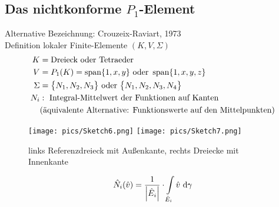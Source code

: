 \subsection{Das nichtkonforme \texorpdfstring{$P_1$}{P\_1}-Element}
Alternative Bezeichnung: Crouzeix-Raviart, 1973\\
Definition lokaler Finite-Elemente $(K,V,\Sigma)$
\begin{align*}
	K&=\text{Dreieck oder Tetraeder}\\
	V&=P_1(K)=\operatorname{span}\{1,x,y\}\text{ oder }\operatorname{span}\{1,x,y,z\}\\
	\Sigma&=\big\{N_1,N_2,N_3\big\}\text{ oder }\big\lbrace N_1,N_2,N_3,N_4\big\rbrace\\
	N_i&:\text{ Integral-Mittelwert der Funktionen auf Kanten}\\
	&\text{(äquivalente Alternative: Funktionswerte auf den Mittelpunkten)}
\end{align*}

\begin{beisp}\enter
	\begin{figure}[!ht]
		\begin{center}
			\texttt{[image: pics/Sketch6.png]}
			\texttt{[image: pics/Sketch7.png]}
			\caption{links Referenzdreieck mit Außenkante, rechts Dreiecke mit Innenkante}
			\label{AbbKantentypen}
		\end{center}
	\end{figure}
	\begin{align*}
		\hat{N}_i(\hat{v})=\frac{1}{\left\lvert\hat{E}_i\right\rvert}\cdot\int\limits_{\hat{E}_i}\hat{v}\text{ d}\gamma
	\end{align*}
\end{beisp}

